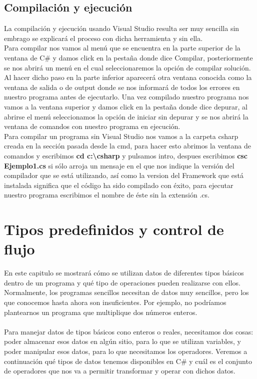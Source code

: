 \documentclass[12pt,a4paper]{report}
\begin{document}
\section{Compilación y ejecución}
La compilación y ejecución usando Visual Studio resulta ser muy sencilla sin embrago se explicará el proceso con dicha herramienta y sin ella.\\Para compilar nos vamos al menú que se encuentra en la parte superior de la ventana de C\# y damos click en la pestaña donde dice Compilar, posteriormente se nos abrirá un menú en el cual seleccionaremos la opción de compilar solución. Al hacer dicho paso en la parte inferior aparecerá otra ventana conocida como la ventana de salida o de output donde se nos informará de todos los errores en nuestro programa antes de ejecutarlo. Una vez compilado nuestro programa nos vamos a la ventana superior y damos click en la pestaña donde dice depurar, al abrirse el menú seleccionamos la opción de iniciar sin depurar y se nos abrirá la ventana de comandos con nuestro programa en ejecución.\\Para compilar un programa sin Visual Studio nos vamos a la carpeta csharp creada en la sección pasada desde la cmd, para hacer esto abrimos la ventana de comandos y escribimos \textbf{cd c:\textbackslash csharp} y pulsamos intro, despues escribimos \textbf{csc Ejemplo1.cs} si sólo arroja un mensaje en el que nos indique la versión del compilador que se está utilizando, así como la version del Framework que está instalada significa que el código ha sido compilado con éxito, para ejecutar nuestro programa escribimos el nombre de éste sin la extensión .cs.


\chapter{Tipos predefinidos y control de flujo}
En este capitulo se mostrará cómo se utilizan datos de diferentes tipos básicos dentro de un programa y qué tipo de operaciones pueden realizarse con ellos.\\Normalmente, los programas sencillos necesitan de datos muy sencillos, pero los que conocemos hasta ahora son insuficientes. Por ejemplo, no podríamos plantearnos un programa que multiplique dos números enteros.\\\\Para manejar datos de tipos básicos cono enteros o reales, necesitamos dos cosas: poder almacenar esos datos en algún sitio, para lo que se utilizan variables, y poder manipular esos datos, para lo que necesitamos los operadores. Veremos a continuación qué tipos de datos tenemos disponibles en C\# y cuál es el conjunto de operadores que nos va a permitir transformar y operar con dichos datos.
\end{document}

